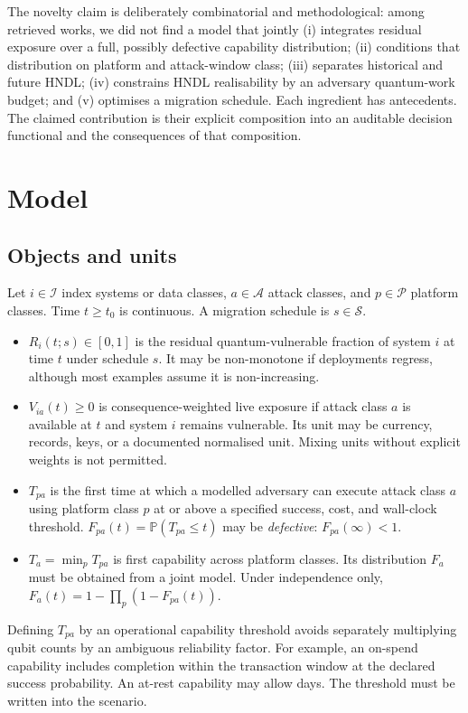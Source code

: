 \documentclass[10pt]{article}
\newcommand{\Prb}{\mathbb{P}}
\begin{document}
The novelty claim is deliberately combinatorial and methodological: among retrieved works, we did not find a model that jointly (i) integrates residual exposure over a full, possibly defective capability distribution; (ii) conditions that distribution on platform and attack-window class; (iii) separates historical and future HNDL; (iv) constrains HNDL realisability by an adversary quantum-work budget; and (v) optimises a migration schedule. Each ingredient has antecedents. The claimed contribution is their explicit composition into an auditable decision functional and the consequences of that composition.

\section{Model}

\subsection{Objects and units}

Let $i\in\mathcal I$ index systems or data classes, $a\in\mathcal A$ attack classes, and $p\in\mathcal P$ platform classes. Time $t\ge t_0$ is continuous. A migration schedule is $s\in\mathcal S$.

\begin{itemize}
\item $R_i(t;s)\in[0,1]$ is the residual quantum-vulnerable fraction of system $i$ at time $t$ under schedule $s$. It may be non-monotone if deployments regress, although most examples assume it is non-increasing.
\item $V_{ia}(t)\ge0$ is consequence-weighted live exposure if attack class $a$ is available at $t$ and system $i$ remains vulnerable. Its unit may be currency, records, keys, or a documented normalised unit. Mixing units without explicit weights is not permitted.
\item $T_{pa}$ is the first time at which a modelled adversary can execute attack class $a$ using platform class $p$ at or above a specified success, cost, and wall-clock threshold. $F_{pa}(t)=\Prb(T_{pa}\le t)$ may be \emph{defective}: $F_{pa}(\infty)<1$.
\item $T_a=\min_p T_{pa}$ is first capability across platform classes. Its distribution $F_a$ must be obtained from a joint model. Under independence only, $F_a(t)=1-\prod_p(1-F_{pa}(t))$.
\end{itemize}

Defining $T_{pa}$ by an operational capability threshold avoids separately multiplying qubit counts by an ambiguous reliability factor. For example, an on-spend capability includes completion within the transaction window at the declared success probability. An at-rest capability may allow days. The threshold must be written into the scenario.
\end{document}
